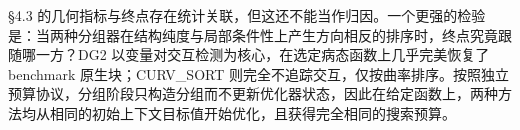 §4.3 的几何指标与终点存在统计关联，但这还不能当作归因。一个更强的检验是：当两种分组器在结构纯度与局部条件性上产生方向相反的排序时，终点究竟跟随哪一方？DG2 以变量对交互检测为核心，在选定病态函数上几乎完美恢复了 benchmark 原生块；CURV\_SORT 则完全不追踪交互，仅按曲率排序。按照独立预算协议，分组阶段只构造分组而不更新优化器状态，因此在给定函数上，两种方法均从相同的初始上下文目标值开始优化，且获得完全相同的搜索预算。
